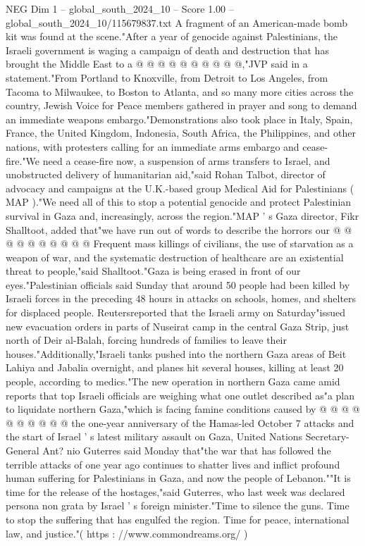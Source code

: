 \begin{textsample}{NEG Dim 1 – global\_south\_2024\_10 – Score 1.00 – global\_south\_2024\_10/115679837.txt}
A fragment of an American-made bomb kit was found at the scene."After a year of genocide against Palestinians, the Israeli government is waging a campaign of death and destruction that has brought the Middle East to a @ @ @ @ @ @ @ @ @ @,"JVP said in a statement."From Portland to Knoxville, from Detroit to Los Angeles, from Tacoma to Milwaukee, to Boston to Atlanta, and so many more cities across the country, Jewish Voice for Peace members gathered in prayer and song to demand an immediate weapons embargo."Demonstrations also took place in Italy, Spain, France, the United Kingdom, Indonesia, South Africa, the Philippines, and other nations, with protesters calling for an immediate arms embargo and cease-fire."We need a cease-fire now, a suspension of arms transfers to Israel, and unobstructed delivery of humanitarian aid,"said Rohan Talbot, director of advocacy and campaigns at the U.K.-based group Medical Aid for Palestinians ( MAP )."We need all of this to stop a potential genocide and protect Palestinian survival in Gaza and, increasingly, across the region."MAP ' s Gaza director, Fikr Shalltoot, added that"we have run out of words to describe the horrors our @ @ @ @ @ @ @ @ @ @ Frequent mass killings of civilians, the use of starvation as a weapon of war, and the systematic destruction of healthcare are an existential threat to people,"said Shalltoot."Gaza is being erased in front of our eyes."Palestinian officials said Sunday that around 50 people had been killed by Israeli forces in the preceding 48 hours in attacks on schools, homes, and shelters for displaced people.
Reutersreported that the Israeli army on Saturday"issued new evacuation orders in parts of Nuseirat camp in the central Gaza Strip, just north of Deir al-Balah, forcing hundreds of families to leave their houses."Additionally,"Israeli tanks pushed into the northern Gaza areas of Beit Lahiya and Jabalia overnight, and planes hit several houses, killing at least 20 people, according to medics."The new operation in northern Gaza came amid reports that top Israeli officials are weighing what one outlet described as"a plan to liquidate northern Gaza,"which is facing famine conditions caused by @ @ @ @ @ @ @ @ @ @ the one-year anniversary of the Hamas-led October 7 attacks and the start of Israel ' s latest military assault on Gaza, United Nations Secretary-General Ant? nio Guterres said Monday that"the war that has followed the terrible attacks of one year ago continues to shatter lives and inflict profound human suffering for Palestinians in Gaza, and now the people of Lebanon.""It is time for the release of the hostages,"said Guterres, who last week was declared persona non grata by Israel ' s foreign minister."Time to silence the guns.
Time to stop the suffering that has engulfed the region.
Time for peace, international law, and justice."( https : //www.commondreams.org/ )

\end{textsample}
